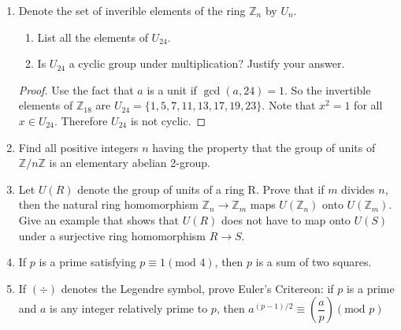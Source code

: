 \documentclass{article}
\theoremstyle{definition}
\begin{document}
\begin{enumerate}
                \begin{proof}
                    Use the fact that $a$ is a unit if $\gcd(a,18)=1$. So the invertible elements of $\mathbb{Z}_{18}$ are $U_{18}=\{1,5,7,11,13,17\}$. Note that $\langle 5 \rangle = \{5,7,17,13,11,1\}=U_{18}$. Therefore $U_{18}$ is cyclic.
                \end{proof}

            \item Denote the set of inverible elements of the ring $\mathbb{Z}_n$ by $U_n$.
                \begin{enumerate}
                    \item List all the elements of $U_{24}$.
                    \item Is $U_{24}$ a cyclic group under multiplication? Justify your answer.
                \end{enumerate}

                \begin{proof}
                    Use the fact that $a$ is a unit if $\gcd(a,24)=1$. So the invertible elements of $\mathbb{Z}_{18}$ are $U_{24}=\{1,5,7,11,13,17,19,23\}$. Note that $x^2=1$ for all $x\in U_{24}$. Therefore $U_{24}$ is not cyclic.
                \end{proof}

            \item Find all positive integers $n$ having the property that the group of units of $\mathbb{Z}/n\mathbb{Z}$ is an elementary abelian 2-group.
            
            \item Let $U(R)$ denote the group of units of a ring R. Prove that if $m$ divides $n$, then the natural ring homomorphism $\mathbb{Z}_n\to\mathbb{Z}_m$ maps $U(\mathbb{Z}_n)$ onto $U(\mathbb{Z}_m)$. Give an example that shows that $U(R)$ does not have to map onto $U(S)$ under a surjective ring homomorphism $R\to S$.
            
            \item If $p$ is a prime satisfying $p\equiv 1(\text{mod } 4)$, then $p$ is a sum of two squares.
            
            \item If $(\div)$ denotes the Legendre symbol, prove Euler's Critereon: if $p$ is a prime and $a$ is any integer relatively prime to $p$, then $a^{(p-1)/2}\equiv \left(\dfrac{a}{p}\right) (\text{mod } p)$
            

\end{enumerate}
\end{document}
